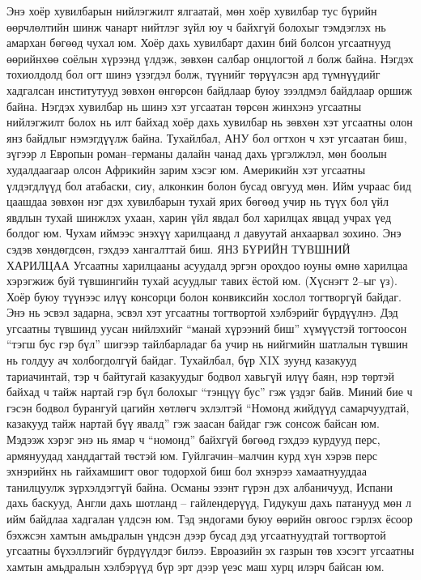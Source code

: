 Энэ хоёр хувилбарын нийлэгжилт ялгаатай, мөн хоёр хувилбар тус бүрийн өөрчлөлтийн шинж чанарт нийтлэг зүйл юу ч байхгүй болохыг тэмдэглэх нь амархан бөгөөд чухал юм. Хоёр дахь хувилбарт дахин бий болсон угсаатнууд өөрийнхөө соёлын хүрээнд үлдэж, зөвхөн салбар онцлогтой л болж байна. Нэгдэх тохиолдолд бол огт шинэ үзэгдэл болж, түүнийг төрүүлсэн ард түмнүүдийг хадгалсан институтууд зөвхөн өнгөрсөн байдлаар буюу зээлдмэл байдлаар оршиж байна. Нэгдэх хувилбар нь шинэ хэт угсаатан төрсөн жинхэнэ угсаатны нийлэгжилт болох нь илт байхад хоёр дахь хувилбар нь зөвхөн хэт угсаатны олон янз байдлыг нэмэгдүүлж байна. Тухайлбал, АНУ бол огтхон ч хэт угсаатан биш, зүгээр л Европын роман–германы далайн чанад дахь үргэлжлэл, мөн боолын худалдаагаар олсон Африкийн зарим хэсэг юм. Америкийн хэт угсаатны үлдэгдлүүд бол атабаски, сиу, алконкин болон бусад овгууд мөн. Ийм учраас бид цаашдаа зөвхөн нэг дэх хувилбарын тухай ярих бөгөөд учир нь түүх бол үйл явдлын тухай шинжлэх ухаан, харин үйл явдал бол харилцах явцад учрах үед болдог юм. Чухам иймээс энэхүү харилцаанд л давуутай анхаарвал зохино. Энэ сэдэв хөндөгдсөн, гэхдээ хангалттай биш.
ЯНЗ БҮРИЙН ТҮВШНИЙ ХАРИЛЦАА
Угсаатны харилцааны асуудалд эргэн орохдоо юуны өмнө харилцаа хэрэгжиж буй түвшингийн тухай асуудлыг тавих ёстой юм. (Хүснэгт 2–ыг үз). Хоёр буюу түүнээс илүү консорци болон конвиксийн хослол тогтворгүй байдаг. Энэ нь эсвэл задарна, эсвэл хэт угсаатны тогтвортой хэлбэрийг бүрдүүлнэ. Дэд угсаатны түвшинд уусан нийлэхийг “манай хүрээний биш” хүмүүстэй тогтоосон “тэгш бус гэр бүл” шигээр тайлбарладаг ба учир нь нийгмийн шатлалын түвшин нь голдуу ач холбогдолгүй байдаг. Тухайлбал, бүр XIX зуунд казакууд тариачинтай, тэр ч байтугай казакуудыг бодвол хавьгүй илүү баян, нэр төртэй байхад ч тайж нартай гэр бүл болохыг “тэнцүү бус” гэж үздэг байв. Миний бие ч гэсэн бодвол бурангуй цагийн хөтлөгч эхлэлтэй “Номонд жийдүүд самарчуудтай, казакууд тайж нартай бүү явалд” гэж заасан байдаг гэж сонсож байсан юм. Мэдээж хэрэг энэ нь ямар ч “номонд” байхгүй бөгөөд гэхдээ курдууд перс, армянуудад ханддагтай төстэй юм. Гуйлгачин–малчин курд хүн хэрэв перс эхнэрийнх нь гайхамшигт овог тодорхой биш бол эхнэрээ хамаатнууддаа танилцуулж зүрхэлдэггүй байна. Османы эзэнт гүрэн дэх албаничууд, Испани дахь баскууд, Англи дахь шотланд – гайлендерүүд, Гидукуш дахь патанууд мөн л ийм байдлаа хадгалан үлдсэн юм. Тэд эндогами буюу өөрийн овгоос гэрлэх ёсоор бэхжсэн хамтын амьдралын үндсэн дээр бусад дэд угсаатнуудтай тогтвортой угсаатны бүхэллэгийг бүрдүүлдэг билээ. Евроазийн эх газрын төв хэсэгт угсаатны хамтын амьдралын хэлбэрүүд бүр эрт дээр үеэс маш хурц илэрч байсан юм.
